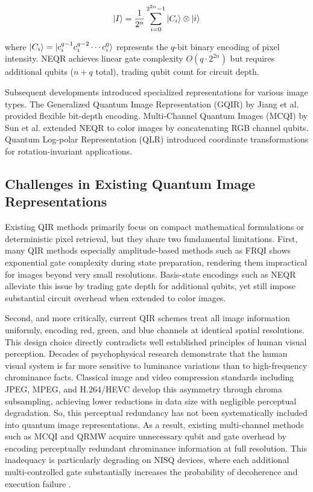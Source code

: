 \documentclass[11pt,a4paper]{article}
\begin{document}
\begin{equation}
\ket{I} = \frac{1}{2^n} \sum_{i=0}^{2^{2n}-1} \ket{C_i} \otimes \ket{i}
\label{eq:neqr}
\end{equation}

where $\ket{C_i} = \ket{c_i^{q-1} c_i^{q-2} \cdots c_i^0}$ represents the $q$-bit binary encoding of pixel intensity. NEQR achieves linear gate complexity $O(q \cdot 2^{2n})$ but requires additional qubits ($n + q$ total), trading qubit count for circuit depth.

Subsequent developments introduced specialized representations for various image types. The Generalized Quantum Image Representation (GQIR) by Jiang et al. \cite{ref18} provided flexible bit-depth encoding. Multi-Channel Quantum Images (MCQI) by Sun et al. \cite{ref8} extended NEQR to color images by concatenating RGB channel qubits. Quantum Log-polar Representation (QLR) \cite{ref19} introduced coordinate transformations for rotation-invariant applications.

\subsection{Challenges in Existing Quantum Image Representations}
Existing QIR methods primarily focus on compact mathematical formulations or deterministic pixel retrieval, but they share two fundamental limitations. First, many QIR methods especially amplitude-based methods such as FRQI shows exponential gate complexity during state preparation, rendering them impractical for images beyond very small resolutions. Basis-state encodings such as NEQR alleviate this issue by trading gate depth for additional qubits, yet still impose substantial circuit overhead when extended to color images.

Second, and more critically, current QIR schemes treat all image information uniformly, encoding red, green, and blue channels at identical spatial resolutions. This design choice directly contradicts well established principles of human visual perception. Decades of psychophysical research demonstrate that the human visual system is far more sensitive to luminance variations than to high-frequency chrominance facts. Classical image and video compression standards including JPEG, MPEG, and H.264/HEVC develop this asymmetry through chroma subsampling, achieving lower reductions in data size with negligible perceptual degradation. So, this perceptual redundancy has not been systematically included into quantum image representations. As a result, existing multi-channel methods such as MCQI and QRMW acquire unnecessary qubit and gate overhead by encoding perceptually redundant chrominance information at full resolution. This inadequacy is particularly degrading on NISQ devices, where each additional multi-controlled gate substantially increases the probability of decoherence and execution failure \cite{ref6}.
\end{document}

